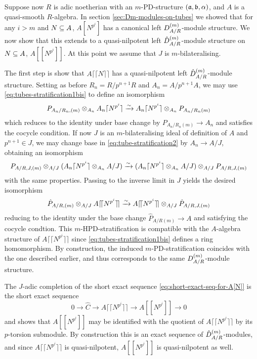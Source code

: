 \documentclass{article}
\theoremstyle{change}
\numberwithin{equation}{subsubsection}
\newcommand\lc{\lceil}
\newcommand\lcc{\lceil\!\lceil}
\newcommand\rc{\rceil}
\newcommand\rcc{\rceil\!\rceil}
\begin{document}
Suppose now $R$ is adic noetherian with an $m$-PD-structure
$({\mathfrak a},{\mathfrak b},\alpha)$, and $A$ is a quasi-smooth $R$-algebra. In section
\ref{sec:Dm-modules-on-tubes} we showed that for any $i>m$ and
$N\subseteq A$, $A[N^{p^i}]$ has a canonical left
${D}^{({m})}_{A/R}$-module structure. We now show that this extends to
a quasi-nilpotent left ${\hat D}^{({m})}_{A/R}$-module structure on
$N\subseteq A$, $A[[N^{p^i}]]$. At this point we assume that $J$ is
$m$-bilateralising.

The first step is show that $A\lcc N\rcc$ has a quasi-nilpotent left
${\hat D}^{({m})}_{A/R}$-module structure. Setting as before
$R_n=R/p^{n+1}R$ and $A_n=A/p^{n+1}A$, we 
may use \ref{eq:tubes-stratification1bis} to define an isomorphism
\begin{equation}
  \label{eq:tube-stratification2}
  P_{A_n/R_n,(m)}\tens_{A_n}A_n\lc N^{p^i}\rc
  \isom
  A_n\lc N^{p^i}\rc\tens_{A_n}P_{A_n/R_n(m)}  
\end{equation}
which reduces to the identity under base change by $P_{A_n/R_n(m)}\to
A_n$ and satisfies the cocycle condition. If now $J$ is an
$m$-bilateralising ideal of definition of $A$ and $p^{n+1}\in J$, we
may change base in \ref{eq:tube-stratification2} by $A_n\to A/J$,
obtaining an isomorphism
\begin{displaymath}
  P_{A/R,J,(m)}\tens_{A/J}(A_n\lc N^{p^i}\rc\tens_{A_n}A/J)
  \isom
  (A_n\lc N^{p^i}\rc\tens_{A_n}A/J)\tens_{A/J}P_{A/R,J,(m)}    
\end{displaymath}
with the same properties. Passing to the inverse limit in $J$ yields
the desired isomorphism
\begin{equation}
  \label{eq:tube-stratification3}
  \hat P_{A/R,(m)}\tens_{A/J}A\lcc N^{p^i}\rcc
  \isom
  A\lcc N^{p^i}\rcc\tens_{A/J}\hat P_{A/R,J,(m)}  
\end{equation}
reducing to the identity under the base change $\hat P_{A/R(m)}\to
A$ and satisfying the cocycle condtion. This $m$-HPD-stratification is
compatible with the $A$-algebra structure of $A\lcc N^{p^i}\rcc$ since
\ref{eq:tubes-stratification1bis} defines a ring homomorphism. By
construction, the induced $m$-PD-stratification coincides with the one
described earlier, and thus corresponds to the same
${D}^{({m})}_{A/R}$-module structure. 

The $J$-adic completion of the short exact sequence
\ref{eq:short-exact-seq-for-A[N]} is the short exact sequence
\begin{displaymath}
  0\to \hat C\to A\lcc N^{p^i}\rcc\to A[[N^{p^i}]]\to 0
\end{displaymath}
and shows that $A[[N^{p^i}]]$ may be identified with the quotient of
$A\lcc N^{p^i}\rcc$ by its $p$-torsion submodule. By construction this
is an exact sequence of ${\hat D}^{({m})}_{A/R}$-modules, and since 
$A\lcc N^{p^i}\rcc$ is quasi-nilpotent, $A[[N^{p^i}]]$ is
quasi-nilpotent as well. 
\end{document}
